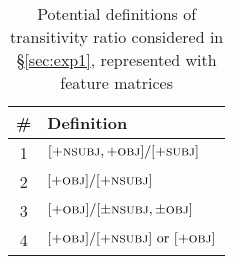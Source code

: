 \begin{table}[ht]
    \centering
    \begin{tabularx}{0.5\textwidth}{cX}
    {\#} & \textbf{Definition} \\
    \hline
    1&$[+\textsc{nsubj}, +\textsc{obj}]/ [+\textsc{subj}]$ \\
    2&$[+\textsc{obj}] / [+\textsc{nsubj}]$  \\
    3&$[+\textsc{obj}] / [\pm\textsc{nsubj}, \pm\textsc{obj}]$\\
    4&$[+\textsc{obj}] / [+\textsc{nsubj}] \text{ or } [+\textsc{obj}]$
    \end{tabularx}
    \caption{Potential definitions of transitivity ratio considered in §\ref{sec:exp1}, represented with feature matrices}\label{tab:transitivity-defs}
\end{table} 